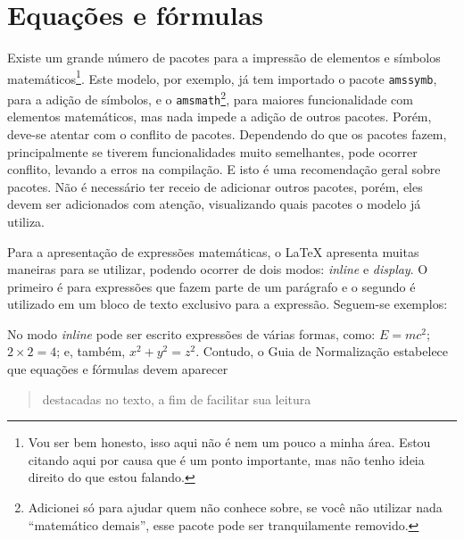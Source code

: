
\section{Equações e fórmulas}
  Existe um grande número de pacotes para a impressão de elementos e símbolos matemáticos\footnote{Vou ser bem honesto, isso aqui não é nem um pouco a minha área. Estou citando aqui por causa que é um ponto importante, mas não tenho ideia direito do que estou falando.}. Este modelo, por exemplo, já tem importado o pacote \texttt{amssymb}, para a adição de símbolos, e o \texttt{amsmath}\footnote{Adicionei só para ajudar quem não conhece sobre, se você não utilizar nada ``matemático demais'', esse pacote pode ser tranquilamente removido.}, para maiores funcionalidade com elementos matemáticos, mas nada impede a adição de outros pacotes. Porém, deve-se atentar com o  conflito de pacotes. Dependendo do que os pacotes fazem, principalmente se tiverem funcionalidades muito semelhantes, pode ocorrer conflito, levando a erros na compilação. E isto é uma recomendação geral sobre pacotes. Não é necessário ter receio de adicionar outros pacotes, porém, eles devem ser adicionados com atenção, visualizando quais pacotes o modelo já utiliza.

  Para a apresentação de expressões matemáticas, o \LaTeX{} apresenta muitas maneiras para se utilizar, podendo ocorrer de dois modos: \textit{inline} e \textit{display}. O primeiro é para expressões que fazem parte de um parágrafo e o segundo é utilizado em um bloco de texto exclusivo para a expressão. Seguem-se exemplos:

  No modo \textit{inline} pode ser escrito expressões de várias formas, como: \(E=mc^2\); $ 2 \times 2 = 4 $; e, também, \begin{math} x^2 + y^2 = z^2 \end{math}. Contudo, o Guia de Normalização estabelece que equações e fórmulas devem aparecer \blockcquote[p. 23]{livro:iffar-guia-normalizacao-2022}{destacadas no texto, a fim de facilitar sua leitura}.
  
